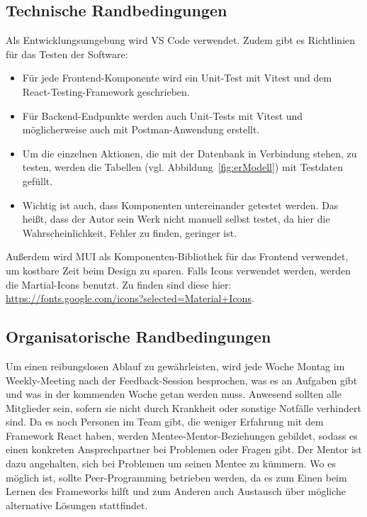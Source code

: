 \documentclass[conference]{IEEEtran}
\begin{document}
\subsection{Technische Randbedingungen}
Als Entwicklungsumgebung wird VS Code verwendet.
Zudem gibt es Richtlinien für das Testen der Software:
\begin{itemize}
    \item Für jede Frontend-Komponente wird ein \gls{Unit-Test} mit \gls{Vitest} und dem React-Testing-Framework geschrieben.
    \item Für Backend-Endpunkte werden auch Unit-Tests mit Vitest und möglicherweise auch mit \gls{Postman}-Anwendung erstellt.
    \item Um die einzelnen Aktionen, die mit der Datenbank in Verbindung stehen, zu testen, werden die Tabellen (vgl. Abbildung~\ref{fig:erModell}) mit Testdaten gefüllt.
    \item Wichtig ist auch, dass Komponenten untereinander getestet werden. Das heißt, dass der Autor sein Werk nicht manuell selbst testet, da hier die Wahrscheinlichkeit, Fehler zu finden, geringer ist.
\end{itemize}
Außerdem wird MUI als Komponenten-Bibliothek für das Frontend verwendet, um kostbare Zeit beim Design zu sparen.
Falls Icons verwendet werden, werden die Martial-Icons benutzt. Zu finden sind diese hier: \url{https://fonts.google.com/icons?selected=Material+Icons}.
\subsection{Organisatorische Randbedingungen}
Um einen reibungslosen Ablauf zu gewährleisten, wird jede Woche Montag im \gls{Weekly-Meeting} nach der Feedback-Session besprochen, was es an Aufgaben gibt und was in der kommenden Woche getan werden muss.
Anwesend sollten alle Mitglieder sein, sofern sie nicht durch Krankheit oder sonstige Notfälle verhindert sind.
Da es noch Personen im Team gibt, die weniger Erfahrung mit dem Framework React haben, werden \gls{Mentee}-\gls{Mentor}-Beziehungen gebildet, sodass es einen konkreten Ansprechpartner bei Problemen oder Fragen gibt.
Der Mentor ist dazu angehalten, sich bei Problemen um seinen Mentee zu kümmern.
Wo es möglich ist, sollte \gls{Peer-Programming} betrieben werden, da es zum Einen beim Lernen des Frameworks hilft und zum Anderen auch Austausch über mögliche alternative Lösungen stattfindet.
\end{document}
